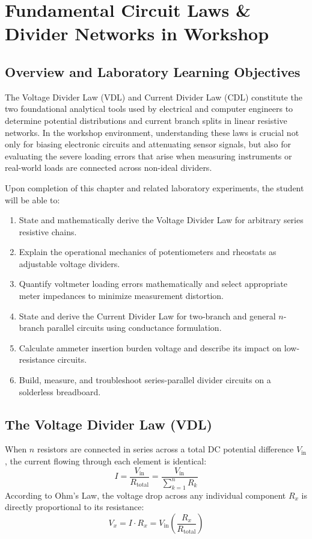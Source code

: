\chapter{Fundamental Circuit Laws \& Divider Networks in Workshop}
\label{chap:dividers}

\section{Overview and Laboratory Learning Objectives}
The Voltage Divider Law (VDL) and Current Divider Law (CDL) constitute the two foundational analytical tools used by electrical and computer engineers to determine potential distributions and current branch splits in linear resistive networks. In the workshop environment, understanding these laws is crucial not only for biasing electronic circuits and attenuating sensor signals, but also for evaluating the severe loading errors that arise when measuring instruments or real-world loads are connected across non-ideal dividers.

\begin{important}
Upon completion of this chapter and related laboratory experiments, the student will be able to:
\begin{enumerate}[leftmargin=1.5em]
    \item State and mathematically derive the Voltage Divider Law for arbitrary series resistive chains.
    \item Explain the operational mechanics of potentiometers and rheostats as adjustable voltage dividers.
    \item Quantify voltmeter loading errors mathematically and select appropriate meter impedances to minimize measurement distortion.
    \item State and derive the Current Divider Law for two-branch and general $n$-branch parallel circuits using conductance formulation.
    \item Calculate ammeter insertion burden voltage and describe its impact on low-resistance circuits.
    \item Build, measure, and troubleshoot series-parallel divider circuits on a solderless breadboard.
\end{enumerate}
\end{important}

\section{The Voltage Divider Law (VDL)}
\begin{definition}
When $n$ resistors are connected in series across a total DC potential difference $V_{\mathrm{in}}$, the current flowing through each element is identical:
\[ I = \frac{V_{\mathrm{in}}}{R_{\mathrm{total}}} = \frac{V_{\mathrm{in}}}{\sum_{k=1}^n R_k} \]
According to Ohm's Law, the voltage drop across any individual component $R_x$ is directly proportional to its resistance:
\[ V_x = I \cdot R_x = V_{\mathrm{in}} \left( \frac{R_x}{R_{\mathrm{total}}} \right) \]
\end{definition}


